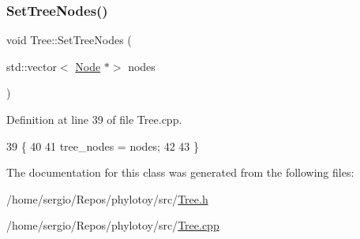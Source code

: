 \subsubsection{\texorpdfstring{Set\+Tree\+Nodes()}{SetTreeNodes()}}
{\footnotesize\ttfamily void Tree\+::\+Set\+Tree\+Nodes (\begin{DoxyParamCaption}\item[{std\+::vector$<$ \hyperlink{classNode}{Node} $\ast$$>$}]{nodes }\end{DoxyParamCaption})}



Definition at line 39 of file Tree.\+cpp.


\begin{DoxyCode}
39                                              \{
40   
41   tree\_nodes = nodes;
42   
43 \}
\end{DoxyCode}


The documentation for this class was generated from the following files\+:\begin{DoxyCompactItemize}
\item 
/home/sergio/\+Repos/phylotoy/src/\hyperlink{Tree_8h}{Tree.\+h}\item 
/home/sergio/\+Repos/phylotoy/src/\hyperlink{Tree_8cpp}{Tree.\+cpp}\end{DoxyCompactItemize}
